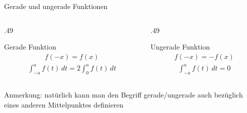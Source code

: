 \begin{frame}{Gerade und ungerade Funktionen}
    \begin{columns}
        \begin{column}{.49\textwidth}
        \begin{block}{Gerade Funktion}
            \begin{gather*}
                f(-x) = f(x)
            \end{gather*}
            \resizebox{\columnwidth}{!}{}
            \begin{gather*}
                \int_{-a}^a f(t)\,dt = 2\int_0^a f(t)\,dt
            \end{gather*}
        \end{block}
    \end{column}
    \begin{column}{.49\textwidth}
        \begin{block}{Ungerade Funktion}
            \begin{gather*}
                f(-x) = -f(x)
            \end{gather*}
            \resizebox{\columnwidth}{!}{}
            \begin{gather*}
                \int_{-a}^a f(t)\,dt = 0
            \end{gather*}
        \end{block}
    \end{column}
    \end{columns}
    
    Anmerkung: natürlich kann man den Begriff gerade/ungerade auch bezüglich eines anderen Mittelpunktes definieren
\end{frame}

